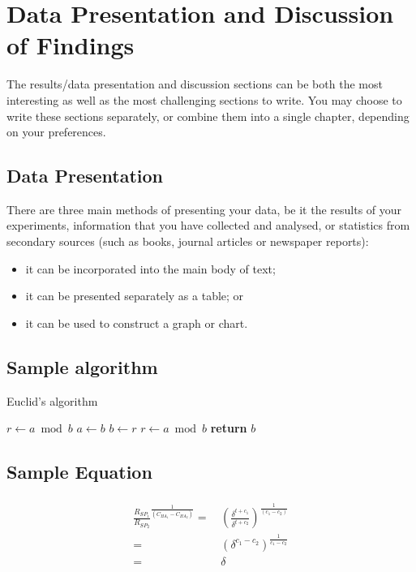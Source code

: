 \chapter{Data Presentation and Discussion of Findings}
The results/data presentation and discussion sections can be both the most interesting as well as the most challenging sections to write. You may choose to write these sections separately, or combine them into a single chapter, depending on your preferences.

\section{Data Presentation}
There are three main methods of presenting your data, be it the results of your experiments, information that you have collected and analysed, or statistics from secondary sources (such as books, journal articles or newspaper reports):

\begin{itemize}
    \item it can be incorporated into the main body of text;
    \item it can be presented separately as a table; or
    \item it can be used to construct a graph or chart.
\end{itemize}

\section{Sample algorithm}
\lipsum[2]
\begin{algorithm}
\caption{Euclid's algorithm}\label{euclid}
\begin{algorithmic}[1]
   \State $r\gets a\bmod b$
      \State $a\gets b$
      \State $b\gets r$
      \State $r\gets a\bmod b$
   \EndWhile\label{euclidendwhile}
   \State \textbf{return} $b$
\EndProcedure
\end{algorithmic}
\end{algorithm}

\section{Sample Equation}

\lipsum[3]

\begin{align}
\label{eqn:soundness}
\begin{split}
	\frac{R_{SP_1}}{R_{SP_2}}^{\frac{1}{(C_{HA_1} - C_{HA_2})}} = \, & (\frac{ \delta^{ t+c_1 } }{ \delta^{ t+c_2 }})^{\frac{1}{(c_1 - c_2)}}  \\
	= \, &  (\delta^{c_1 - c_2})^{\frac{1}{c_1 - c_2}}  \\
	= \, &  \delta
\end{split}
\end{align}
